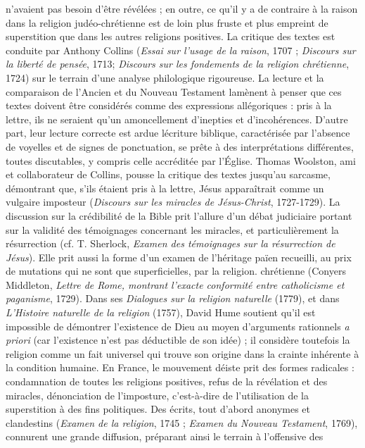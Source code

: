 n'avaient pas besoin d’être révélées ;
en outre, ce qu’il y a de contraire à
la raison dans la religion judéo-chrétienne
est de loin plus fruste et plus empreint de
superstition que dans les autres religions
positives. La critique des textes est
conduite par Anthony Collins ({\it Essai sur
l'usage de la raison}, 1707 ; {\it Discours sur la
liberté de pensée}, 1713; {\it Discours sur les
fondements de la religion chrétienne}, 1724)
sur le terrain d’une analyse philologique
rigoureuse. La lecture et la comparaison
de l'Ancien et du Nouveau Testament
lamènent à penser que ces textes doivent
être considérés comme des expressions
allégoriques : pris à la lettre, ils ne
seraient qu’un amoncellement d’inepties
et d’incohérences. D’autre part, leur lecture
correcte est ardue lécriture
biblique, caractérisée par l’absence de
voyelles et de signes de ponctuation, se
prête à des interprétations différentes,
toutes discutables, y compris celle accréditée
par l’Église. Thomas Woolston, ami
et collaborateur de Collins, pousse la critique
des textes jusqu’au sarcasme,
démontrant que, s’ils étaient pris à la
lettre, Jésus apparaîtrait comme un vulgaire
imposteur ({\it Discours sur les miracles
de Jésus-Christ}, 1727-1729). La discussion
sur la crédibilité de la Bible prit l'allure
d’un débat judiciaire portant sur la validité
des témoignages concernant les
miracles, et particulièrement la résurrection
(cf. T. Sherlock, {\it Examen des témoignages
sur la résurrection de Jésus}). Elle
prit aussi la forme d’un examen de l’héritage
païen recueilli, au prix de mutations
qui ne sont que superficielles, par la religion.
chrétienne (Conyers Middleton,
{\it Lettre de Rome, montrant l’exacte conformité
entre catholicisme et paganisme},
1729). Dans ses {\it Dialogues sur la religion
naturelle} (1779), et dans {\it L'Histoire naturelle
de la religion} (1757), David Hume
soutient qu’il est impossible de démontrer
l'existence de Dieu au moyen d’arguments
rationnels {\it a priori} (car l’existence
n’est pas déductible de son idée) ; il considère
toutefois la religion comme un fait
universel qui trouve son origine dans la
crainte inhérente à la condition humaine.
En France, le mouvement déiste prit des
formes radicales : condamnation de toutes
les religions positives, refus de la révélation
et des miracles, dénonciation de l’imposture,
c’est-à-dire de l’utilisation de la
superstition à des fins politiques. Des
écrits, tout d’abord anonymes et clandestins
({\it Examen de la religion}, 1745 ; {\it Examen
du Nouveau Testament}, 1769),
connurent une grande diffusion, préparant
ainsi le terrain à l'offensive des
